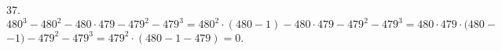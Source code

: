 37. $480^3-480^2-480\cdot479-479^2-479^3=480^2\cdot(480-1)-480\cdot479-479^2-479^3=480\cdot479\cdot(480-$\\$-1)-479^2-479^3=
479^2\cdot(480-1-479)=0.$\\
